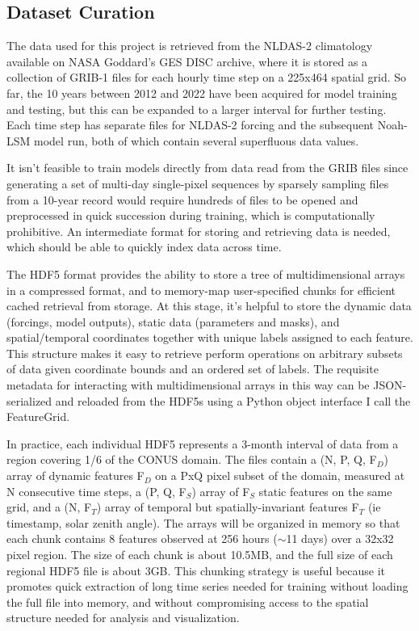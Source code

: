 \documentclass[11pt]{article}
\begin{document}
\begin{multicols}{2}

\subsection{Dataset Curation}

    The data used for this project is retrieved from the NLDAS-2 climatology available on NASA Goddard's GES DISC archive, where it is stored as a collection of GRIB-1 files for each hourly time step on a 225x464 spatial grid. So far, the 10 years between 2012 and 2022 have been acquired for model training and testing, but this can be expanded to a larger interval for further testing. Each time step has separate files for NLDAS-2 forcing and the subsequent Noah-LSM model run, both of which contain several superfluous data values.

    It isn't feasible to train models directly from data read from the GRIB files since generating a set of multi-day single-pixel sequences by sparsely sampling files from a 10-year record would require hundreds of files to be opened and preprocessed in quick succession during training, which is computationally prohibitive. An intermediate format for storing and retrieving data is needed, which should be able to quickly index data across time.

    The HDF5 format provides the ability to store a tree of multidimensional arrays in a compressed format, and to memory-map user-specified chunks for efficient cached retrieval from storage. At this stage, it's helpful to store the dynamic data (forcings, model outputs), static data (parameters and masks), and spatial/temporal coordinates together with unique labels assigned to each feature. This structure makes it easy to retrieve perform operations on arbitrary subsets of data given coordinate bounds and an ordered set of labels. The requisite metadata for interacting with multidimensional arrays in this way can be JSON-serialized and reloaded from the HDF5s using a Python object interface I call the FeatureGrid.

    In practice, each individual HDF5 represents a 3-month interval of data from a region covering 1/6 of the CONUS domain. The files contain a (N, P, Q, F$_D$) array of dynamic features F$_D$ on a PxQ pixel subset of the domain, measured at N consecutive time steps, a (P, Q, F$_S$) array of F$_S$ static features on the same grid, and a (N, F$_T$) array of temporal but spatially-invariant features F$_T$ (ie timestamp, solar zenith angle). The arrays will be organized in memory so that each chunk contains 8 features observed at 256 hours ($\sim$11 days) over a 32x32 pixel region. The size of each chunk is about 10.5MB, and the full size of each regional HDF5 file is about 3GB. This chunking strategy is useful because it promotes quick extraction of long time series needed for training without loading the full file into memory, and without compromising access to the spatial structure needed for analysis and visualization.


\end{multicols}
\end{document}
